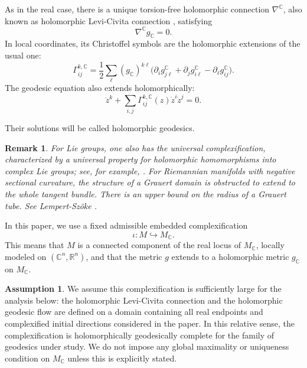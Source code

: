 \documentclass[11pt]{amsart}
\theoremstyle{plain}
\newtheorem{rmk}[thm]{Remark}
\theoremstyle{definition}
\newtheorem{assumption}{Assumption}
\newcommand{\R}{\mathbb{R}}
\newcommand{\C}{\mathbb{C}}
\begin{document}
As in the real case, there is a unique torsion-free holomorphic connection $\nabla^{\C}$, also known as holomorphic Levi-Civita connection \cite{BiswasDumitrescuHRM},  satisfying
\[
\nabla^{\C} g_{\C}=0 .
\]
In local coordinates, its Christoffel symbols are the holomorphic extensions of the usual one:
\[
\Gamma^{k,\C}_{ij}
=
\frac12\sum_{\ell}(g_{\C})^{k\ell}
\bigl(
\partial_i g^{\C}_{j\ell}
+
\partial_j g^{\C}_{i\ell}
-
\partial_\ell g^{\C}_{ij}
\bigr).
\]
The geodesic equation also extends holomorphically:
\begin{equation}\label{eq:holomorphic-geodesic}
\ddot z^k+\sum_{i,j}\Gamma^{k,\C}_{ij}(z)\dot z^i\dot z^j=0.    
\end{equation}


Their solutions will be called holomorphic geodesics. 






\begin{rmk} 
For Lie groups, one also has
the universal complexification, characterized by a universal property for
holomorphic homomorphisms into complex Lie groups; see, for example,
\cite{Hochschild1965,Hochschild1966,HilgertNeeb2012,Neeb2000}.  For Riemannian manifolds with negative sectional curvature, the structure of a Grauert domain is obstructed to extend to the whole tangent bundle. There is an upper bound on the radius of a Grauert tube. See Lempert-Sz\"oke \cite{LS,Sz}. 
\end{rmk}



In this paper, we use a fixed admissible embedded complexification
\[
\iota:M\hookrightarrow M_{\mathbb C}.
\]
This means that $M$ is a connected component of the real locus of $M_{\C}$, locally modeled on
$(\mathbb C^n,\mathbb R^n)$, and that the metric $g$ extends to a
holomorphic metric $g_{\mathbb C}$ on $M_{\mathbb C}$.  


\begin{assumption}\label{assumption}
We assume this complexification is sufficiently large for the analysis below: the
holomorphic Levi-Civita connection and the holomorphic geodesic flow are
defined on a domain containing all real endpoints and complexified initial
directions considered in the paper.  In this
relative sense, the complexification is holomorphically geodesically
complete for the family of geodesics under study.  We do not impose any
global maximality or uniqueness condition on $M_{\mathbb C}$ unless this
is explicitly stated.    
\end{assumption}
\end{document}
